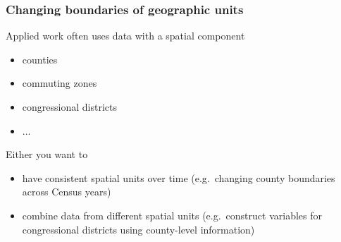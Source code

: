 \documentclass{beamer}
\begin{document}

\begin{frame}
\frametitle{Changing boundaries of geographic units}
Applied work often uses data with a spatial component
\begin{itemize}
    \item counties
    \item commuting zones
    \item congressional districts
    \item ...
\end{itemize}
\bigskip

Either you want to
\begin{itemize}
    \item have consistent spatial units over time (e.g.\ changing county boundaries across Census years)
    \item combine data from different spatial units (e.g.\ construct variables for congressional districts using county-level information)
\end{itemize}

\end{frame}

\end{document}
